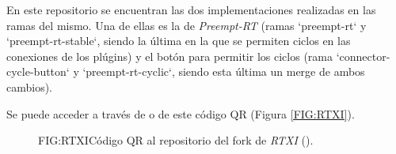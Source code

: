 
En este repositorio se encuentran las dos implementaciones realizadas en las ramas del mismo. Una de ellas es la de \textit{Preempt-RT} (ramas `preempt-rt` y `preempt-rt-stable`, siendo la última en la que se permiten ciclos en las conexiones de los plúgins) y el botón para permitir los ciclos (rama `connector-cycle-button` y `preempt-rt-cyclic`, siendo esta última un merge de ambos cambios).

Se puede acceder a través de  o de este código QR (Figura \ref{FIG:RTXI}).

\begin{figure}[QR repositorio de RTXI]{FIG:RTXI}{Código QR al repositorio del fork de \textit{RTXI} ().
}
\end{figure}
